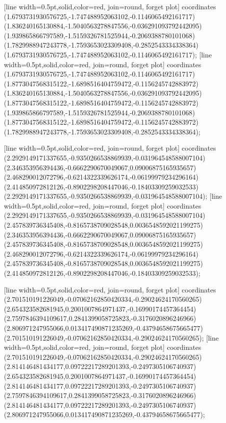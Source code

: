 [line width=0.5pt,solid,color=red, join=round, forget plot] coordinates {(1.6793731930576725,-1.747488952063102,-0.1146065492161717) (1.836240165130884,-1.5040563278847556,-0.036291093792442095) (1.939865866797589,-1.5159326781525944,-0.2069388780101068) (1.7829988947243778,-1.7593653023309408,-0.2852543334338364) (1.6793731930576725,-1.747488952063102,-0.1146065492161717)};
[line width=0.5pt,solid,color=red, join=round, forget plot] coordinates {(1.6793731930576725,-1.747488952063102,-0.1146065492161717) (1.8773047568315122,-1.6898516404759472,-0.1156245742883972) (1.836240165130884,-1.5040563278847556,-0.036291093792442095) (1.8773047568315122,-1.6898516404759472,-0.1156245742883972) (1.939865866797589,-1.5159326781525944,-0.2069388780101068) (1.8773047568315122,-1.6898516404759472,-0.1156245742883972) (1.7829988947243778,-1.7593653023309408,-0.2852543334338364)};

[line width=0.5pt,solid,color=red, join=round, forget plot] coordinates {(2.2929149171337655,-0.9350266538869939,-0.031964548588007104) (2.346353956394436,-0.6662290670049067,0.09006875165935657) (2.468290012072796,-0.6214322339626174,-0.06199979234296164) (2.414850972812126,-0.8902298208447046,-0.18403309259032533) (2.2929149171337655,-0.9350266538869939,-0.031964548588007104)};
[line width=0.5pt,solid,color=red, join=round, forget plot] coordinates {(2.2929149171337655,-0.9350266538869939,-0.031964548588007104) (2.457839736345408,-0.8165738709028548,0.0036548592021199275) (2.346353956394436,-0.6662290670049067,0.09006875165935657) (2.457839736345408,-0.8165738709028548,0.0036548592021199275) (2.468290012072796,-0.6214322339626174,-0.06199979234296164) (2.457839736345408,-0.8165738709028548,0.0036548592021199275) (2.414850972812126,-0.8902298208447046,-0.18403309259032533)};

[line width=0.5pt,solid,color=red, join=round, forget plot] coordinates {(2.701510191226049,-0.07062162850420334,-0.29024624170560265) (2.654323582681945,0.2001007864971437,-0.16990174457364454) (2.7597846394109617,0.2841399058725823,-0.3176020896246966) (2.806971247955066,0.013417490871235269,-0.43794658675665477) (2.701510191226049,-0.07062162850420334,-0.29024624170560265)};
[line width=0.5pt,solid,color=red, join=round, forget plot] coordinates {(2.701510191226049,-0.07062162850420334,-0.29024624170560265) (2.814146481434177,0.09722217289201393,-0.2497305106740937) (2.654323582681945,0.2001007864971437,-0.16990174457364454) (2.814146481434177,0.09722217289201393,-0.2497305106740937) (2.7597846394109617,0.2841399058725823,-0.3176020896246966) (2.814146481434177,0.09722217289201393,-0.2497305106740937) (2.806971247955066,0.013417490871235269,-0.43794658675665477)};

